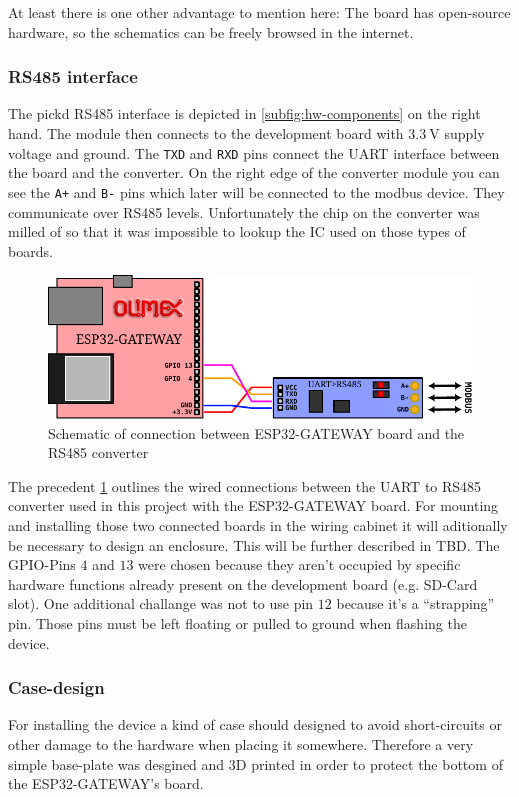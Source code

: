 			At least there is one other advantage to mention here: The board has open-source hardware, so the schematics can be freely browsed in the internet.
	\subsubsection{RS485 interface}
		The pickd RS485 interface is depicted in \cref{subfig:hw-components} on the right hand. The module then connects to the development board with $ 3.3~\si{\volt} $ supply voltage and ground. The \texttt{TXD} and \texttt{RXD} pins connect the \ac{UART} interface between the board and the converter. On the right edge of the converter module you can see the \texttt{A+} and \texttt{B-} pins which later will be connected to the modbus device. They communicate over RS485 levels. Unfortunately the chip on the converter was milled of so that it was impossible to lookup the \ac{IC} used on those types of boards.
		
		\begin{figure}[H]
			\includegraphics[width=\linewidth]{assets/RD-esp-rs485-hw-conn.pdf}
			\caption{Schematic of connection between ESP32-GATEWAY board and the RS485 converter}
			\label{fig:gw-converter-hwconn}
		\end{figure}
		
		The precedent \cref{fig:gw-converter-hwconn} outlines the wired connections between the UART to RS485 converter used in this project with the ESP32-GATEWAY board. For mounting and installing those two connected boards in the wiring cabinet it will aditionally be necessary to design an enclosure. This will be further described in TBD.%
		The GPIO-Pins $ 4 $ and $ 13 $ were chosen because they aren't occupied by specific hardware functions already present on the development board (e.g. SD-Card slot). One additional challange was not to use pin $ 12 $ because it's a \enquote{strapping} pin. Those pins must be left floating or pulled to ground when flashing the device.
		
	\subsubsection{Case-design}
		For installing the device a kind of case should designed to avoid short-circuits or other damage to the hardware when placing it somewhere. Therefore a very simple base-plate was desgined and 3D printed in order to protect the bottom of the ESP32-GATEWAY's board.
		
